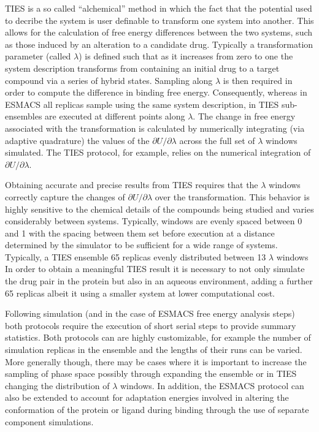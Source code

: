 
TIES is a so called ``alchemical'' method in which the fact that the potential 
used to decribe the system is user definable to transform one system into 
another. This allows for the calculation of free energy differences between 
the two systems, such as those induced by an alteration to a candidate drug.
Typically a transformation parameter (called $\lambda$) is defined such 
that as it increases from zero to one the system description transforms from 
containing an initial drug to a target compound via a series of hybrid states.
Sampling along $\lambda$ is then required in order to compute the difference 
in binding free energy. Consequently, whereas in ESMACS all replicas sample 
using the same system description, in TIES sub-ensembles are executed at 
different points along $\lambda$. The change in free energy associated 
with the transformation is calculated by numerically integrating 
(via adaptive quadrature) the values of the $\partial U/\partial\lambda$ 
across the full set of $\lambda$ windows simulated. The TIES protocol, 
for example, relies on the numerical integration of $\partial U/\partial\lambda$. 

Obtaining accurate and precise results from TIES requires that the $\lambda$ 
windows correctly capture the changes of $\partial U/\partial\lambda$ over 
the transformation. This behavior is highly sensitive to
the chemical details of the compounds being studied and varies considerably 
between systems. Typically, windows are evenly spaced between 0 and 1 with 
the spacing between them set before execution at a distance determined by the 
simulator to be sufficient for a wide range of systems. Typically, a TIES 
ensemble 65 replicas evenly distributed between 13 $\lambda$ windows
In order to obtain a meaningful TIES result it is necessary to not only 
simulate the drug pair in the protein but also in an aqueous environment, 
adding a further 65 replicas albeit it using a smaller system at lower 
computational cost.

Following simulation (and in the case of ESMACS free energy analysis steps) 
both protocols require the execution of short serial steps to provide summary 
statistics. Both protocols can are highly customizable, for example the number 
of simulation replicas in the ensemble and the lengths of their runs can be 
varied. More generally though, there may be cases where it is important to 
increase the sampling of phase space possibly through expanding the ensemble 
or in TIES changing the distribution of $\lambda$ windows.
In addition, the ESMACS protocol can also be extended to account for 
adaptation energies involved in altering the conformation of the protein 
or ligand during binding through the use of separate component simulations.

